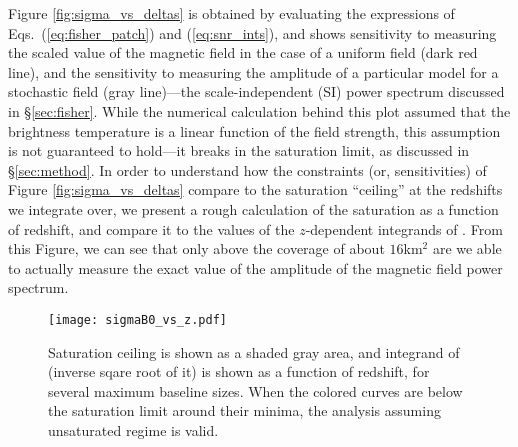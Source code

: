 Figure \ref{fig:sigma_vs_deltas} is obtained by evaluating the expressions of Eqs.~(\ref{eq:fisher_patch}) and (\ref{eq:snr_ints}), and shows sensitivity to measuring the scaled value of the magnetic field in the case of a uniform field (dark red line), and the sensitivity to measuring the amplitude of a particular model for a stochastic field (gray line)---the scale-independent (SI) power spectrum discussed in \S\ref{sec:fisher}. While the numerical calculation behind this plot assumed that the brightness temperature is a linear function of the field strength, this assumption is not guaranteed to hold---it breaks in the saturation limit, as discussed in \S\ref{sec:method}. In order to understand how the constraints (or, sensitivities) of Figure \ref{fig:sigma_vs_deltas} compare to the saturation ``ceiling'' at the redshifts we integrate over, we present a rough calculation of the saturation as a function of redshift, and compare it to the values of the $z$-dependent integrands of \eq{\ref{eq:fisher_patch}}. From this Figure, we can see that only above the coverage of about $16$km$^2$ are we able to actually measure the exact value of the amplitude of the magnetic field power spectrum.
\begin{figure}
\centering
\texttt{[image: sigmaB0\_vs\_z.pdf]}
\caption{Saturation ceiling is shown as a shaded gray area, and integrand of \eq{\ref{eq:fisher_patch}} (inverse sqare root of it) is shown as a function of redshift, for several maximum baseline sizes.  When the colored curves are below the saturation limit around their minima, the analysis assuming unsaturated regime is valid.\label{fig:Bsat}}
\end{figure}
